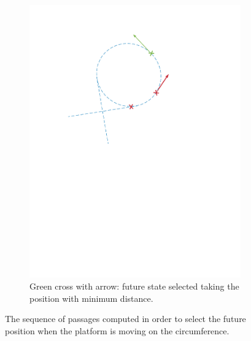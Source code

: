 \begin{itemize}
\begin{figure}[!htbp]
\begin{subfigure}[b]{0.45\textwidth}
        \includegraphics[width=\textwidth]{img/circular_movment8.pdf}
        \caption{Green cross with arrow: future state selected taking the position with minimum distance.}
        \label{fig:eight}
   \end{subfigure}
  \caption{The sequence of passages computed in order to select the future position when the platform is moving on the circumference.}
  \label{fig:sequence_find_next_position_circumference}
\end{figure} 
\end{itemize}

